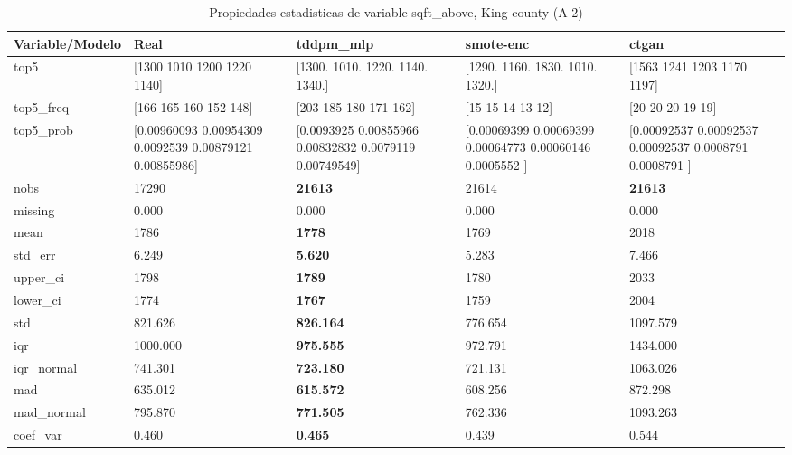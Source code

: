 \begin{table}[H]
\centering
\fontsize{8}{14}\selectfont
\caption{Propiedades  estadisticas de variable sqft\_above, King county (A-2)}
\label{table-stats-king county-a-2-sqft_above}
\begin{tabular}{|l|m{10em}|m{10em}|m{10em}|m{10em}|}
\hline
 \rowcolor[gray]{0.8}
Variable/Modelo & Real & tddpm\_mlp & smote-enc & ctgan \\
\hline top5 & [1300 1010 1200 1220 1140] & [1300. 1010. 1220. 1140. 1340.] & [1290. 1160. 1830. 1010. 1320.] & [1563 1241 1203 1170 1197] \\
\hline top5\_freq & [166 165 160 152 148] & [203 185 180 171 162] & [15 15 14 13 12] & [20 20 20 19 19] \\
\hline top5\_prob & [0.00960093 0.00954309 0.0092539  0.00879121 0.00855986] & [0.0093925  0.00855966 0.00832832 0.0079119  0.00749549] & [0.00069399 0.00069399 0.00064773 0.00060146 0.0005552 ] & [0.00092537 0.00092537 0.00092537 0.0008791  0.0008791 ] \\
\hline nobs & 17290 & \bfseries 21613 & \cellcolor[rgb]{0.9, 0.54, 0.52} 21614 & \bfseries 21613 \\
\hline missing & 0.000 & 0.000 & 0.000 & 0.000 \\
\hline mean & 1786 & \bfseries 1778 & 1769 & \cellcolor[rgb]{0.9, 0.54, 0.52} 2018 \\
\hline std\_err & 6.249 & \bfseries 5.620 & 5.283 & \cellcolor[rgb]{0.9, 0.54, 0.52} 7.466 \\
\hline upper\_ci & 1798 & \bfseries 1789 & 1780 & \cellcolor[rgb]{0.9, 0.54, 0.52} 2033 \\
\hline lower\_ci & 1774 & \bfseries 1767 & 1759 & \cellcolor[rgb]{0.9, 0.54, 0.52} 2004 \\
\hline std & 821.626 & \bfseries 826.164 & 776.654 & \cellcolor[rgb]{0.9, 0.54, 0.52} 1097.579 \\
\hline iqr & 1000.000 & \bfseries 975.555 & 972.791 & \cellcolor[rgb]{0.9, 0.54, 0.52} 1434.000 \\
\hline iqr\_normal & 741.301 & \bfseries 723.180 & 721.131 & \cellcolor[rgb]{0.9, 0.54, 0.52} 1063.026 \\
\hline mad & 635.012 & \bfseries 615.572 & 608.256 & \cellcolor[rgb]{0.9, 0.54, 0.52} 872.298 \\
\hline mad\_normal & 795.870 & \bfseries 771.505 & 762.336 & \cellcolor[rgb]{0.9, 0.54, 0.52} 1093.263 \\
\hline coef\_var & 0.460 & \bfseries 0.465 & 0.439 & \cellcolor[rgb]{0.9, 0.54, 0.52} 0.544 \\

\end{tabular}
\end{table}
